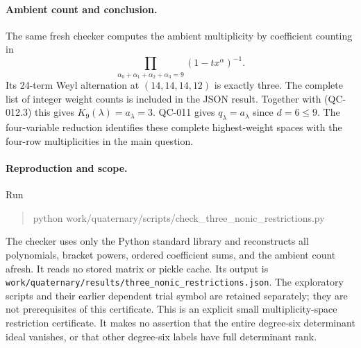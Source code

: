 \paragraph{Ambient count and conclusion.}
The same fresh checker computes the ambient multiplicity by coefficient
counting in
\[
 \prod_{\alpha_0+\alpha_1+\alpha_2+\alpha_3=9}
       (1-tx^\alpha)^{-1}.
\]
Its 24-term Weyl alternation at $(14,14,14,12)$ is exactly three.
The complete list of integer weight counts is included in the JSON
result.  Together with (QC-012.3) this gives $K_9(\lambda)=a_\lambda=3$.
QC-011 gives $q_\lambda=a_\lambda$ since $d=6\leq9$.
The four-variable reduction identifies these complete highest-weight
spaces with the four-row multiplicities in the main question.

\paragraph{Reproduction and scope.}
Run
\begin{quote}\ttfamily\small
python work/quaternary/scripts/check\_three\_nonic\_restrictions.py
\end{quote}
The checker uses only the Python standard library and reconstructs all
polynomials, bracket powers, ordered coefficient sums, and the ambient
count afresh.  It reads no stored matrix or pickle cache.  Its output
is \texttt{work/quaternary/results/three\_nonic\_restrictions.json}.
The exploratory scripts and their earlier dependent trial symbol are
retained separately; they are not prerequisites of this certificate.
This is an explicit small multiplicity-space restriction certificate.
It makes no assertion that the entire degree-six determinant ideal
vanishes, or that other degree-six labels have full determinant rank.
